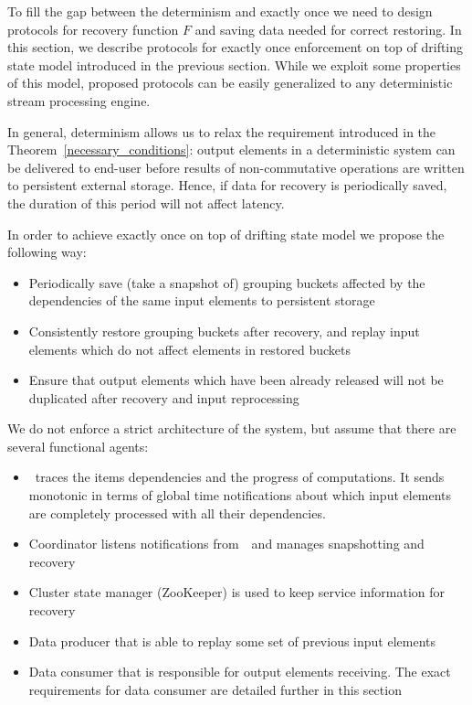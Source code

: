 
\label {fs-consistency-section}

To fill the gap between the determinism and exactly once we need to design protocols for recovery function $F$ and saving data needed for correct restoring. In this section, we describe protocols for exactly once enforcement on top of drifting state model introduced in the previous section. While we exploit some properties of this model, proposed protocols can be easily generalized to any deterministic stream processing engine.

In general, determinism allows us to relax the requirement introduced in the Theorem~\ref{necessary_conditions}: output elements in a deterministic system can be delivered to end-user before results of non-commutative operations are written to persistent external storage. Hence, if data for recovery is periodically saved, the duration of this period will not affect latency.

In order to achieve exactly once on top of drifting state model we propose the following way:
\begin{itemize}
    \item Periodically save (take a snapshot of) grouping buckets affected by the dependencies of the same input elements to persistent storage
    \item Consistently restore grouping buckets after recovery, and replay input elements which do not affect elements in restored buckets
    \item Ensure that output elements which have been already released will not be duplicated after recovery and input reprocessing
\end{itemize}

We do not enforce a strict architecture of the system, but assume that there are several functional agents:
\begin{itemize}
    \item \Acker\ traces the items dependencies and the progress of computations. It sends monotonic in terms of global time notifications about which input elements are completely processed with all their dependencies.
    \item Coordinator listens notifications from~\Acker\ and manages snapshotting and recovery
    \item Cluster state manager (ZooKeeper) is used to keep service information for recovery
    \item Data producer that is able to replay some set of previous input elements
    \item Data consumer that is responsible for output elements receiving. The exact requirements for data consumer are detailed further in this section
\end{itemize}


